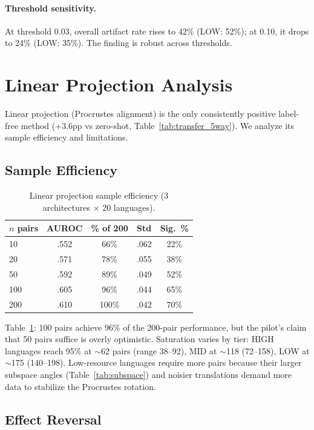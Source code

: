 \documentclass[11pt,a4paper]{article}
\begin{document}
\paragraph{Threshold sensitivity.}
At threshold 0.03, overall artifact rate rises to 42\% (LOW: 52\%); at 0.10, it drops to 24\% (LOW: 35\%).
The finding is robust across thresholds.

\section{Linear Projection Analysis}
\label{sec:linproj}

Linear projection (Procrustes alignment) is the only consistently positive label-free method ($+$3.6pp vs zero-shot, Table~\ref{tab:transfer_5way}).
We analyze its sample efficiency and limitations.

\subsection{Sample Efficiency}

\begin{table}[t]
\centering
\small
\caption{Linear projection sample efficiency (3 architectures $\times$ 20 languages).}
\label{tab:sampleeff}
\begin{tabular}{lcccc}
\toprule
$n$ pairs & AUROC & \% of 200 & Std & Sig.\ \% \\
\midrule
10 & .552 & 66\% & .062 & 22\% \\
20 & .571 & 78\% & .055 & 38\% \\
50 & .592 & 89\% & .049 & 52\% \\
100 & .605 & 96\% & .044 & 65\% \\
200 & .610 & 100\% & .042 & 70\% \\
\bottomrule
\end{tabular}
\end{table}

Table~\ref{tab:sampleeff}: 100 pairs achieve 96\% of the 200-pair performance, but the pilot's claim that 50 pairs suffice is overly optimistic.
Saturation varies by tier: HIGH languages reach 95\% at $\sim$62 pairs (range 38--92), MID at $\sim$118 (72--158), LOW at $\sim$175 (140--198).
Low-resource languages require more pairs because their larger subspace angles (Table~\ref{tab:subspace}) and noisier translations demand more data to stabilize the Procrustes rotation.

\subsection{Effect Reversal}
\end{document}
